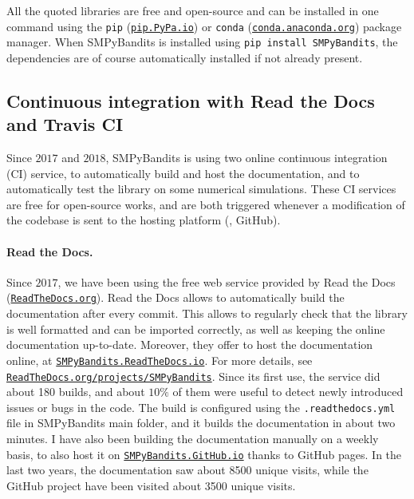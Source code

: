 All the quoted libraries are free and open-source and can be installed in one command using the \texttt{pip} (\texttt{\href{https://pip.pypa.io/}{pip.PyPa.io}}) or \texttt{conda} (\texttt{\href{http://conda.anaconda.org/}{conda.anaconda.org}}) package manager.
%
When SMPyBandits is installed using \texttt{pip install SMPyBandits}, the dependencies are of course automatically installed if not already present.


\subsection{Continuous integration with Read the Docs and Travis CI}


Since $2017$ and $2018$, SMPyBandits is using two online continuous integration (CI) service, to automatically build and host the documentation, and to automatically test the library on some numerical simulations.
%
These CI services are free for open-source works, and are both triggered whenever a modification of the codebase is sent to the hosting platform (\ie, GitHub).

\paragraph{Read the Docs.}
Since $2017$, we have been using the free web service provided by Read the Docs (\href{https://readthedocs.org/}{\texttt{ReadTheDocs.org}}).
Read the Docs allows to automatically build the documentation after every commit. This allows to regularly check that the library is well formatted and can be imported correctly, as well as keeping the online documentation up-to-date.
Moreover, they offer to host the documentation online, at \href{https://smpybandits.rtfd.io/}{\texttt{SMPyBandits.ReadTheDocs.io}}.
For more details, see \href{https://readthedocs.org/projects/smpybandits/}{\texttt{ReadTheDocs.org/projects/SMPyBandits}}.
%
Since its first use, the service did about 180 builds, and about $10\%$ of them were useful to detect newly introduced issues or bugs in the code.
The build is configured using the \texttt{.readthedocs.yml} file in SMPyBandits main folder, and it builds the documentation in about two minutes.
I have also been building the documentation manually on a weekly basis, to also host it on \href{https://smpybandits.github.io/}{\texttt{SMPyBandits.GitHub.io}} thanks to GitHub pages.
In the last two years, the documentation saw about 8500 unique visits, while the GitHub project have been visited about 3500 unique visits.



